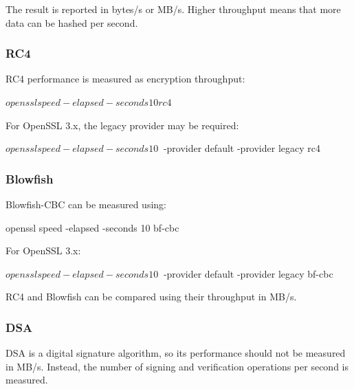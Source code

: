 \documentclass[a4paper, 10pt]{article}
\begin{document}
\begin{problem}
\begin{subproblems_alpha}
\begin{solution}
		      The result is reported in bytes/s or MB/s. Higher throughput means that more data can be hashed per second.

		      \subsubsection*{RC4}

		      RC4 performance is measured as encryption throughput:

		      \begin{codingbox}[language=bash, deletekeywords={in}]
$ openssl speed -elapsed -seconds 10 rc4
$
\end{codingbox}

		      For OpenSSL 3.x, the legacy provider may be required:

		      \begin{codingbox}[language=bash, deletekeywords={in}]
$ openssl speed -elapsed -seconds 10 \
$     -provider default -provider legacy rc4
\end{codingbox}

		      \subsubsection*{Blowfish}

		      Blowfish-CBC can be measured using:

		      \begin{codingbox}[language=bash, deletekeywords={in}]
openssl speed -elapsed -seconds 10 bf-cbc
\end{codingbox}

		      For OpenSSL 3.x:

		      \begin{codingbox}[language=bash, deletekeywords={in}]
$ openssl speed -elapsed -seconds 10 \
$     -provider default -provider legacy bf-cbc
\end{codingbox}

		      RC4 and Blowfish can be compared using their throughput in MB/s.

		      \subsubsection*{DSA}

		      DSA is a digital signature algorithm, so its performance should not be measured in MB/s.
		      Instead, the number of signing and verification operations per second is measured.


\end{solution}
\end{subproblems_alpha}
\end{problem}
\end{document}
